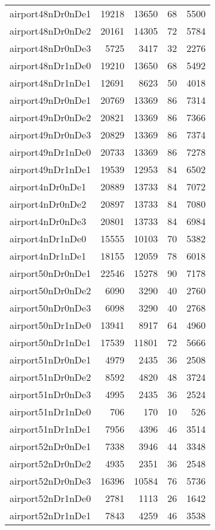 \begin{longtable}{lrrrr}
airport48nDr0nDe1 & 19218 & 13650 & 68 & 5500 \\
airport48nDr0nDe2 & 20161 & 14305 & 72 & 5784 \\
airport48nDr0nDe3 & 5725 & 3417 & 32 & 2276 \\
airport48nDr1nDe0 & 19210 & 13650 & 68 & 5492 \\
airport48nDr1nDe1 & 12691 & 8623 & 50 & 4018 \\
airport49nDr0nDe1 & 20769 & 13369 & 86 & 7314 \\
airport49nDr0nDe2 & 20821 & 13369 & 86 & 7366 \\
airport49nDr0nDe3 & 20829 & 13369 & 86 & 7374 \\
airport49nDr1nDe0 & 20733 & 13369 & 86 & 7278 \\
airport49nDr1nDe1 & 19539 & 12953 & 84 & 6502 \\
airport4nDr0nDe1 & 20889 & 13733 & 84 & 7072 \\
airport4nDr0nDe2 & 20897 & 13733 & 84 & 7080 \\
airport4nDr0nDe3 & 20801 & 13733 & 84 & 6984 \\
airport4nDr1nDe0 & 15555 & 10103 & 70 & 5382 \\
airport4nDr1nDe1 & 18155 & 12059 & 78 & 6018 \\
airport50nDr0nDe1 & 22546 & 15278 & 90 & 7178 \\
airport50nDr0nDe2 & 6090 & 3290 & 40 & 2760 \\
airport50nDr0nDe3 & 6098 & 3290 & 40 & 2768 \\
airport50nDr1nDe0 & 13941 & 8917 & 64 & 4960 \\
airport50nDr1nDe1 & 17539 & 11801 & 72 & 5666 \\
airport51nDr0nDe1 & 4979 & 2435 & 36 & 2508 \\
airport51nDr0nDe2 & 8592 & 4820 & 48 & 3724 \\
airport51nDr0nDe3 & 4995 & 2435 & 36 & 2524 \\
airport51nDr1nDe0 & 706 & 170 & 10 & 526 \\
airport51nDr1nDe1 & 7956 & 4396 & 46 & 3514 \\
airport52nDr0nDe1 & 7338 & 3946 & 44 & 3348 \\
airport52nDr0nDe2 & 4935 & 2351 & 36 & 2548 \\
airport52nDr0nDe3 & 16396 & 10584 & 76 & 5736 \\
airport52nDr1nDe0 & 2781 & 1113 & 26 & 1642 \\
airport52nDr1nDe1 & 7843 & 4259 & 46 & 3538 \\

\end{longtable}
